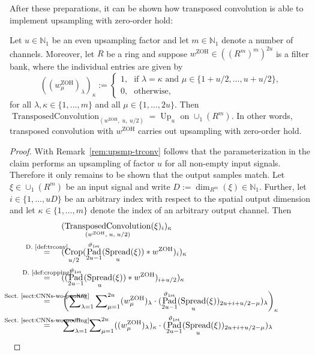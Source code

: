\documentclass[journal]{IEEEtran}
\newcommand{\N}{\mathbb{N}}
\newcommand{\conv}{\ast}
\newcommand{\discint}[2]{\{#1,\dotsc,#2\}}
\newcommand{\inint}[2]{\in\discint{#1}{#2}}
\newcommand{\equsing}[1]{\overset{\mathclap{\text{#1}}}{=}}
\DeclareMathOperator{\Upsampling}{Up}
\DeclareMathOperator{\Padding}{Pad}
\DeclareMathOperator{\Cropping}{Crop}
\DeclareMathOperator{\Spreading}{Spread}
\DeclareMathOperator{\TransposedConvolution}{TransposedConvolution}
\DeclareMathOperator{\ZOH}{ZOH}
\newcommand{\Dirichlet}{1\text{st}}
\begin{document}
After these preparations, it can be shown how transposed convolution is able to implement upsampling with zero-order hold:
\begin{theorem}
\label{thm:trconvupzoh}
Let $u\in\N_1$ be an even upsampling factor and let $m\in\N_1$ denote a number of channels.
Moreover, let $R$ be a ring and suppose $w^{\ZOH}\in((R^m)^m)^{2u}$ is a filter bank, where the individual entries are given by
\begin{displaymath}
  ((w^{\ZOH}_\mu)_\lambda)_\kappa :=
  \begin{cases}
    1\text{,} & \text{if }\lambda = \kappa\text{ and }\mu\inint{1 + u/2}{u + u/2}\text{,}\\
    0\text{,} & \text{otherwise,}
  \end{cases}
\end{displaymath}
for all $\lambda,\kappa\inint{1}{m}$ and all $\mu\inint{1}{2u}$.
Then $\TransposedConvolution_{(w^{\ZOH},\; u,\; u/2)} = \Upsampling_u$ on $\cup_1(R^m)$.
In other words, transposed convolution with $w^{\ZOH}$ carries out upsampling with zero-order hold.
\end{theorem}\begin{proof}
With Remark~\ref{rem:upsmp-trconv} follows that the parameterization in the claim performs an upsampling of factor $u$ for all non-empty input signals.
Therefore it only remains to be shown that the output samples match.
Let $\xi\in\cup_1(R^m)$ be an input signal and write $D := \dim_{R^m}(\xi)\in\N_1$.
Further, let $i\inint{1}{uD}$ be an arbitrary index with respect to the spatial output dimension and let $\kappa\inint{1}{m}$ denote the index of an arbitrary output channel.
Then
\begin{align*}
  & (\TransposedConvolution_{(w^{\ZOH},\; u,\; u/2)}(\xi)_i)_\kappa\\
  \equsing{D.~\ref{def:trconv}}\ \ \ \ & (\Cropping_{u/2}( \Padding_{2u - 1}^{\vartheta_{\Dirichlet}}( \Spreading_u(\xi)) \conv w^{\ZOH})_i)_\kappa\\
  \equsing{D.~\ref{def:cropping}}\ \ \ \ & ((\Padding_{2u - 1}^{\vartheta_{\Dirichlet}}( \Spreading_u(\xi)) \conv w^{\ZOH})_{i + u/2})_\kappa\\
  \equsing{Sect.~\ref{sect:CNNs-wo-pooling}}\ \ \ \ & \left(\sum\nolimits_{\lambda = 1}^m\sum\nolimits_{\mu = 1}^{2u} (w^{\ZOH}_\mu)_\lambda \cdot (\Padding_{2u - 1}^{\vartheta_{\Dirichlet}}( \Spreading_u(\xi))_{2u + i + u/2 - \mu})_\lambda\right)_\kappa\\
  \equsing{Sect.~\ref{sect:CNNs-wo-pooling}}\ \ \ \ & \sum\nolimits_{\lambda = 1}^m\sum\nolimits_{\mu = 1}^{2u} ((w^{\ZOH}_\mu)_\lambda)_\kappa \cdot (\Padding_{2u - 1}^{\vartheta_{\Dirichlet}}( \Spreading_u(\xi))_{2u + i + u/2 - \mu})_\lambda\\

\end{align*}
\end{proof}
\end{document}
